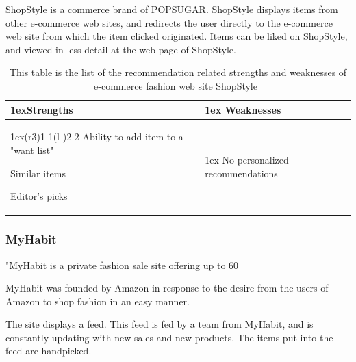     ShopStyle is a commerce brand of POPSUGAR.
    ShopStyle displays items from other e-commerce web sites, and redirects the user directly to the e-commerce web site from which the item clicked originated.
    Items can be liked on ShopStyle, and viewed in less detail at the web page of ShopStyle.
    \begin{table}[H]
                    \centering
                    \begin{tabularx}{\linewidth}{>{\parskip1ex}X@{\kern4\tabcolsep}>{\parskip1ex}X}
                    \toprule
                    \hfil\bfseries Strengths
                    &
                    \hfil\bfseries Weaknesses
                    \\\cmidrule(r{3\tabcolsep}){1-1}\cmidrule(l{-\tabcolsep}){2-2}
                Ability to add item to a "want list" \par
                Similar items \par
                Editor's picks \par
            &
                No personalized recommendations \par
            \\ \bottomrule
        \end{tabularx}
        \caption[Recommendation related strengths and weaknesses of ShopStyle~\cite{ShopStyle}]{This table is the list of the recommendation related strengths and weaknesses of e-commerce fashion web site ShopStyle~\cite{ShopStyle}}
        \label{table:ecommenreceShopStyle}
    \end{table}

\subsubsection{MyHabit} %
\label{par:myhabit}
    "MyHabit is a private fashion sale site offering up to 60%

    MyHabit was founded by Amazon in response to the desire from the users of Amazon to shop fashion in an easy manner.

    The site displays a feed.
    This feed is fed by a team from MyHabit, and is constantly updating with new sales and new products.
    The items put into the feed are handpicked.

